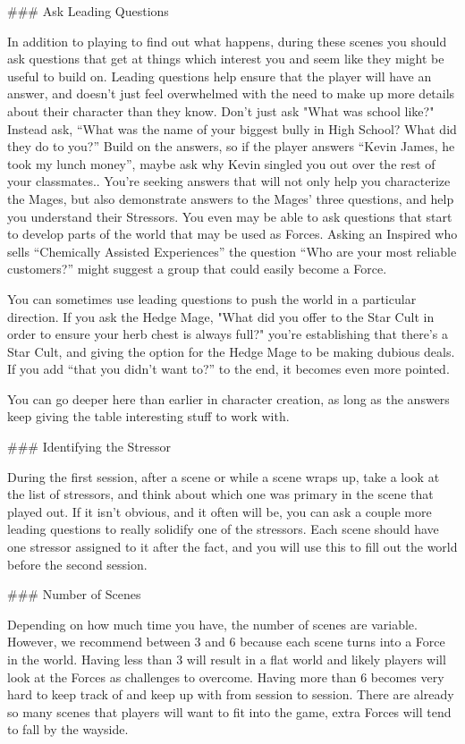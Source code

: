 \documentclass[
  oneside,
  statementpaper,
  9pt]{memoir}
\begin{document}
\begin{MC}
### Ask Leading Questions

In addition to playing to find out what happens, during these scenes you should ask questions that get at things which interest you and seem like they might be useful to build on. Leading questions help ensure that the player will have an answer, and doesn’t just feel overwhelmed with the need to make up more details about their character than they know. Don’t just ask "What was school like?" Instead ask, “What was the name of your biggest bully in High School? What did they do to you?” Build on the answers, so if the player answers “Kevin James, he took my lunch money”, maybe ask why Kevin singled you out over the rest of your classmates.. You’re seeking answers that will not only help you characterize the Mages, but also demonstrate answers to the Mages’ three questions, and help you understand their Stressors. You even may be able to ask questions that start to develop parts of the world that may be used as Forces. Asking an Inspired who sells “Chemically Assisted Experiences” the question “Who are your most reliable customers?” might suggest a group that could easily become a Force.

You can sometimes use leading questions to push the world in a particular direction. If you ask the Hedge Mage, "What did you offer to the Star Cult in order to ensure your herb chest is always full?" you’re establishing that there’s a Star Cult, and giving the option for the Hedge Mage to be making dubious deals. If you add “that you didn’t want to?” to the end, it becomes even more pointed.

You can go deeper here than earlier in character creation, as long as the answers keep giving the table interesting stuff to work with.

### Identifying the Stressor

During the first session, after a scene or while a scene wraps up, take a look at the list of stressors, and think about which one was primary in the scene that played out. If it isn’t obvious, and it often will be, you can ask a couple more leading questions to really solidify one of the stressors. Each scene should have one stressor assigned to it after the fact, and you will use this to fill out the world before the second session.

### Number of Scenes

Depending on how much time you have, the number of scenes are variable. However, we recommend between 3 and 6 because each scene turns into a Force in the world. Having less than 3 will result in a flat world and likely players will look at the Forces as challenges to overcome. Having more than 6 becomes very hard to keep track of and keep up with from session to session. There are already so many scenes that players will want to fit into the game, extra Forces will tend to fall by the wayside.

\end{MC}
\end{document}
